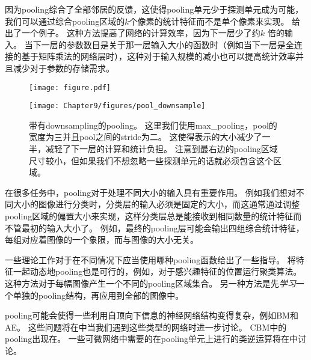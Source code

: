  
因为\gls{pooling}综合了全部邻居的反馈，这使得\gls{pooling}单元少于探测单元成为可能，我们可以通过综合\gls{pooling}区域的$k$个像素的统计特征而不是单个像素来实现。
给出了一个例子。
这种方法提高了网络的计算效率，因为下一层少了约$k$ 倍的输入。
当下一层的参数数目是关于那一层输入大小的函数时（例如当下一层是全连接的基于矩阵乘法的网络层时），这种对于输入规模的减小也可以提高统计效率并且减少对于参数的存储需求。
\begin{figure}[!htb]
\ifOpenSource
\centerline{\texttt{[image: figure.pdf]}}
\else
\centerline{\texttt{[image: Chapter9/figures/pool\_downsample]}}
\fi
\caption{带有\gls{downsampling}的\gls{pooling}。
这里我们使用\gls{max_pooling}，\gls{pool}的宽度为三并且\gls{pool}之间的\gls{stride}为二。
这使得表示的大小减少了一半，减轻了下一层的计算和统计负担。
注意到最右边的\gls{pooling}区域尺寸较小，但如果我们不想忽略一些探测单元的话就必须包含这个区域。}
\label{fig:chap9_pool_downsample}
\end{figure}

 
在很多任务中，\gls{pooling}对于处理不同大小的输入具有重要作用。
例如我们想对不同大小的图像进行分类时，分类层的输入必须是固定的大小，而这通常通过调整\gls{pooling}区域的偏置大小来实现，这样分类层总是能接收到相同数量的统计特征而不管最初的输入大小了。
例如，最终的\gls{pooling}层可能会输出四组综合统计特征，每组对应着图像的一个象限，而与图像的大小无关。

一些理论工作对于在不同情况下应当使用哪种\gls{pooling}函数给出了一些指导\citep{boureau-icml-10}。
将特征一起动态地\gls{pooling}也是可行的，例如，对于感兴趣特征的位置运行聚类算法\citep{boureau-iccv-11}。
这种方法对于每幅图像产生一个不同的\gls{pooling}区域集合。
另一种方法是先\emph{学习}一个单独的\gls{pooling}结构，再应用到全部的图像中\citep{jia2012beyond}。

\gls{pooling}可能会使得一些利用自顶向下信息的神经网络结构变得复杂，例如\gls{BM}和\gls{AE}。
这些问题将在中当我们遇到这些类型的网络时进一步讨论。
\gls{CBM}中的\gls{pooling}出现在。
一些可微网络中需要的在\gls{pooling}单元上进行的类逆运算将在中讨论。

